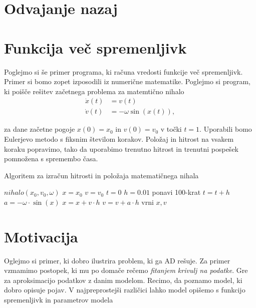 \documentclass[12pt,slovene]{article}
\begin{document}
\section{Odvajanje nazaj}

\section{Funkcija več spremenljivk}

Poglejmo si še primer programa, ki računa vredosti funkcije več spremenljivk. Primer si bomo zopet izposodili iz numerične matematike. Poglejmo si program, ki poišče rešitev začetnega problema za matemtično nihalo
\begin{align}    
    \dot{x}(t) &= v(t)\\
    \dot{v}(t) &= -\omega \sin(x(t)),
\end{align}

za dane začetne pogoje $x(0)=x_0$ in $v(0)=v_0$ v točki $t=1$. Uporabili bomo Eulerjevo metodo s fiksnim številom korakov. Položaj in hitrost na vsakem koraku popravimo, tako da uporabimo trenutno hitrost in trenutni pospešek pomnožena s spremembo časa.

\begin{algorithm}[H]
\caption{Algoritem za izračun hitrosti in položaja matematičnega nihala}\label{alg:nihalo}
\begin{algorithmic}\State
$nihalo(x_0, v_0, \omega)$
\State\quad $x = x_0$
\State\quad $v = v_0$
\State\quad $t = 0$
\State\quad $h = 0.01$
\State\quad ponavi 100-krat
\State\quad\quad $t = t + h$
\State\quad\quad $a = - \omega\cdot \sin(x)$
\State\quad\quad $x = x + v\cdot h$
\State\quad\quad $v = v + a\cdot h$
\State vrni $x, v$
\end{algorithmic}
\end{algorithm}


\section{Motivacija}

Oglejmo si primer, ki dobro ilustrira problem, ki ga AD rešuje. Za primer vzmamimo postopek, ki mu po domače rečemo \emph{fitanjem krivulj na podatke}. Gre za aproksimacijo podatkov z danim modelom. Recimo, da poznamo model, ki dobro opisuje pojav. V najpreprostejši različici lahko model opišemo s funkcijo spremenljivk in parametrov modela
\end{document}
